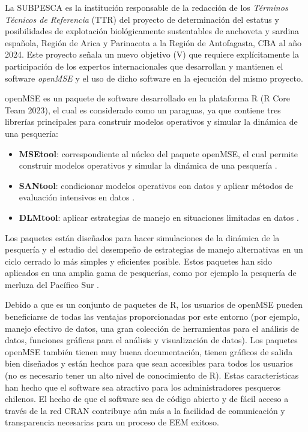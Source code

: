 
La SUBPESCA es la institución responsable de la redacción de los \textit{Términos Técnicos de Referencia} (TTR) del proyecto de determinación del estatus y posibilidades de explotación biológicamente sustentables de anchoveta y sardina española, Región de Arica y Parinacota a la Región de Antofagasta, CBA al año 2024. Este proyecto señala un nuevo objetivo (V) que requiere explícitamente la participación de los expertos internacionales que desarrollan y mantienen el software \textit{openMSE} y el uso de dicho software en la ejecución del mismo proyecto. 
\newline

openMSE es un paquete de software desarrollado en la plataforma R (R Core Team 2023), el cual es considerado como un paraguas, ya que contiene tres librerías principales para construir modelos operativos y simular la dinámica de una pesquería:

\begin{itemize}
    \item \textbf{MSEtool}: correspondiente al núcleo del paquete openMSE, el cual permite construir modelos operativos y simular la dinámica de una pesquería \citep{Hordyk2023}.
    \item \textbf{SANtool}: condicionar modelos operativos con datos y aplicar métodos de evaluación intensivos en datos \citep{Huynh2023}. 
    \item \textbf{DLMtool}: aplicar estrategias de manejo en situaciones limitadas en datos \citep{carruthers2018data}.
\end{itemize}

Los paquetes están diseñados para hacer simulaciones de la dinámica de la pesquería y el estudio del desempeño de estrategias de manejo alternativas en  un ciclo cerrado lo más simples y eficientes posible. Estos paquetes han sido aplicados en una amplia gama de pesquerías, como por ejemplo la pesquería de merluza del Pacífico Sur \citep{Hordyk2019}.
\newline

Debido a que es un conjunto de paquetes de R, los usuarios de openMSE pueden beneficiarse de todas las ventajas proporcionadas por este entorno (por ejemplo, manejo efectivo de datos, una gran colección de herramientas para el análisis de datos, funciones gráficas para el análisis y visualización de datos). Los paquetes openMSE también tienen muy buena documentación, tienen gráficos de salida bien diseñados y están hechos para que sean accesibles para todos los usuarios (no es necesario tener un alto nivel de conocimiento de R). Estas características han hecho que el software sea atractivo para los administradores pesqueros chilenos. El hecho de que el software sea de código abierto y de fácil acceso a través de la red CRAN contribuye aún más a la facilidad de comunicación y transparencia necesarias para un proceso de EEM exitoso.
